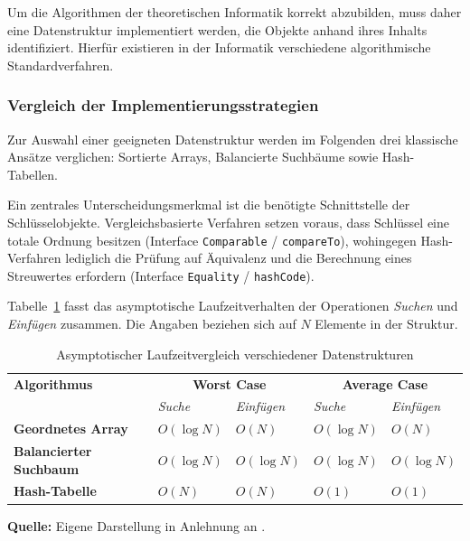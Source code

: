 Um die Algorithmen der theoretischen Informatik korrekt abzubilden, muss daher eine Datenstruktur implementiert werden, die Objekte anhand ihres Inhalts identifiziert. Hierfür existieren in der Informatik verschiedene algorithmische Standardverfahren.

\subsubsection{Vergleich der Implementierungsstrategien}
Zur Auswahl einer geeigneten Datenstruktur werden im Folgenden drei klassische Ansätze verglichen: Sortierte Arrays, Balancierte Suchbäume sowie Hash-Tabellen.

Ein zentrales Unterscheidungsmerkmal ist die benötigte Schnittstelle der Schlüsselobjekte. Vergleichsbasierte Verfahren setzen voraus, dass Schlüssel eine totale Ordnung besitzen (Interface \texttt{Comparable} / \texttt{compareTo}), wohingegen Hash-Verfahren lediglich die Prüfung auf Äquivalenz und die Berechnung eines Streuwertes erfordern (Interface \texttt{Equality} / \texttt{hashCode}).

Tabelle~\ref{tab:complexity_comparison} fasst das asymptotische Laufzeitverhalten der Operationen \emph{Suchen} und \emph{Einfügen} zusammen. Die Angaben beziehen sich auf $N$ Elemente in der Struktur.

\begin{table}[H]
	\centering
	\caption{Asymptotischer Laufzeitvergleich verschiedener Datenstrukturen}
	\label{tab:complexity_comparison}
	\renewcommand{\arraystretch}{1.3}
	\begin{tabularx}{\textwidth}{@{}l l l l l@{}}
		\toprule
		\textbf{Algorithmus} & \multicolumn{2}{c}{\textbf{Worst Case}} & \multicolumn{2}{c}{\textbf{Average Case}} \\
		& \textit{Suche} & \textit{Einfügen} & \textit{Suche} & \textit{Einfügen} \\
		\midrule
		\textbf{Geordnetes Array} & $O(\log N)$ & $O(N)$ & $O(\log N)$ & $O(N)$ \\
		\addlinespace
		\textbf{Balancierter Suchbaum} & $O(\log N)$ & $O(\log N)$ & $O(\log N)$ & $O(\log N)$ \\
		\addlinespace
		\textbf{Hash-Tabelle} & $O(N)$ & $O(N)$ & $O(1)$ & $O(1)$ \\
		\bottomrule
	\end{tabularx}
	
	\vspace{0.2cm}
	\raggedright \footnotesize \textbf{Quelle:} Eigene Darstellung in Anlehnung an \autocite[S. 520]{sedgewick2014algorithmen}.
\end{table}


